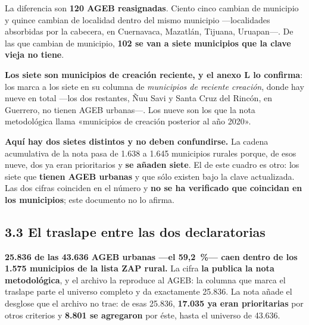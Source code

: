La diferencia son \textbf{120 AGEB reasignadas}. Ciento cinco cambian de municipio y quince
cambian de localidad dentro del mismo municipio ---localidades absorbidas por la cabecera, en
Cuernavaca, Mazatlán, Tijuana, Uruapan---. De las que cambian de municipio, \textbf{102 se
van a siete municipios que la clave vieja no tiene}.



\textbf{Los siete son municipios de creación reciente, y el anexo L lo confirma}: los marca a
los siete en su columna de \emph{municipios de reciente creación}, donde hay nueve en total
---los dos restantes, Ñuu Savi y Santa Cruz del Rincón, en Guerrero, no tienen AGEB urbanas---.
Los nueve son los que la nota metodológica llama «municipios de creación posterior al año
2020».

\textbf{Aquí hay dos sietes distintos y no deben confundirse.} La cadena acumulativa de la
nota pasa de 1.638 a 1.645 municipios rurales porque, de esos nueve, dos ya eran prioritarios
y \textbf{se añaden siete}. El de este cuadro es otro: los siete que \textbf{tienen AGEB
urbanas} y que sólo existen bajo la clave actualizada. Las dos cifras coinciden en el número y
\textbf{no se ha verificado que coincidan en los municipios}; este documento no lo afirma.


\subsection*{3.3 El traslape entre las dos declaratorias}

\textbf{25.836 de las 43.636 AGEB urbanas ---el 59,2~\%--- caen dentro de los 1.575 municipios
de la lista ZAP rural.} La cifra \textbf{la publica la nota metodológica}, y el archivo la
reproduce al AGEB: la columna que marca el traslape parte el universo completo y da
exactamente 25.836. La nota añade el desglose que el archivo no trae: de esas 25.836,
\textbf{17.035 ya eran prioritarias} por otros criterios y \textbf{8.801 se agregaron} por
éste, hasta el universo de 43.636.

